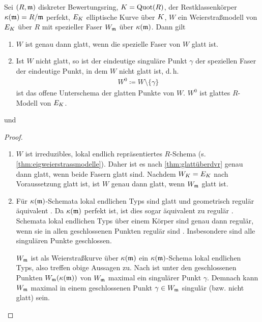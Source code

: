 \documentclass[german]{scrreprt}
\begin{document}
\begin{Lemma}\label{thm:weierstrassglatt}
  Sei $(R,\mathfrak{m})$ diskreter Bewertungsring,
  $K=\operatorname{Quot}(R)$,
  der Restklassenkörper $\kappa(\mathfrak{m})=R/\mathfrak{m}$ perfekt,
  $E_{K}$ elliptische Kurve über $K$,
  $W$ ein Weierstraßmodell von $E_{K}$ über $R$
  mit spezieller Faser $W_{\mathfrak{m}}$ über $\kappa(\mathfrak{m})$.
  Dann gilt
  \begin{enumerate}[label=(\alph*)]
  \item $W$ ist genau dann glatt, wenn die spezielle Faser von $W$ glatt
    ist.
  \item Ist $W$ nicht glatt, so ist der eindeutige singuläre Punkt
    $\gamma$ der speziellen Faser der eindeutige Punkt, in dem $W$
    nicht glatt ist, d.\,h.
    \begin{gather*}
      W^0\coloneqq W\setminus \{\gamma\}
    \end{gather*}
    ist das offene Unterschema der glatten Punkte von $W$.
    $W^0$ ist glattes $R$-Modell von $E_{K}$.
  \end{enumerate}
  
  \cite[Remark IV.5.4.1]{silverman2} und \cite[für die Definition von
  guter Reduktion][Chapter VII.5]{silverman}

  \begin{proof}
    \begin{enumerate}[label=(\alph*)]
    \item $W$ ist irreduzibles, lokal endlich repräsentiertes
      $R$-Schema (s. \autoref{thm:eigweierstrassmodelle}).
      Daher ist es nach \autoref{thm:glattüberdvr} genau dann glatt,
      wenn beide Fasern glatt sind. Nachdem $W_{K}=E_{K}$ nach
      Voraussetzung glatt ist, ist $W$ genau dann glatt, wenn $W_{\mathfrak{m}}$
      glatt ist.
    \item Für $\kappa(\mathfrak{m})$-Schemata lokal endlichen Typs sind glatt und
      geometrisch regulär äquivalent \cite[Corollary 6.32]{wedhorn}.
      Da $\kappa(\mathfrak{m})$ perfekt ist, ist dies sogar äquivalent zu regulär
      \cite[Remark 6.33]{wedhorn}.
      Schemata lokal endlichen Typs über einem Körper sind genau dann
      regulär, wenn sie in allen geschlossenen Punkten regulär sind
      \cite[Remark 6.25 (3)]{wedhorn}. Insbesondere sind alle
      singulären Punkte geschlossen.

      $W_{\mathfrak{m}}$ ist als Weierstraßkurve über $\kappa(\mathfrak{m})$ ein $\kappa(\mathfrak{m})$-Schema
      lokal endlichen Typs, also treffen obige Aussagen zu.
      Nach \cite[Proposition III.1.4]{silverman} ist unter den
      geschlossenen Punkten $W_{\mathfrak{m}}(\kappa(\mathfrak{m}))$ von $W_{\mathfrak{m}}$ maximal ein
      singulärer Punkt $\gamma$. Demnach kann $W_{\mathfrak{m}}$ maximal in einem
      geschlossenen Punkt $\gamma\in W_{\mathfrak{m}}$ singulär (bzw. nicht
      glatt) sein.


\end{enumerate}
\end{proof}
\end{Lemma}
\end{document}
